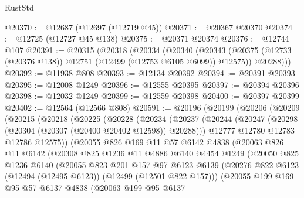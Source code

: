 \begin{lexlean}{RustStd}
\begin{coremodule}
@20370 := @12687 (@12697 (@12719 @45))
@20371 := @20367 @20370
@20374 := @12725 (@12727 @45 @138)
@20375 := @20371 @20374
@20376 := @12744 @107
@20391 := @20315
    (@20318
      (@20334
        (@20340
          (@20343 (@20375 (@12733 (@20376 @138)) @12751 (@12499 (@12753 @6105 @6099)) @12575))
          @20288)))
@20392 := @11938 @808
@20393 := @12134 @20392
@20394 := @20391 @20393
@20395 := @12008 @1249
@20396 := @12555 @20395
@20397 := @20394 @20396
@20398 := @12032 @1249
@20399 := @12559 @20398
@20400 := @20397 @20399
@20402 := @12564 (@12566 @808)
@20591 := @20196
    (@20199
      (@20206
        (@20209
          (@20215
            (@20218
              (@20225
                (@20228
                  (@20234
                    (@20237
                      (@20244
                        (@20247 (@20298 (@20304 (@20307 (@20400 @20402 @12598)) @20288)))
                        @12777
                        @12780
                        @12783
                        @12786
                        @12575))
                    (@20055
                      @826
                      @169
                      @11
                      @57
                      @6142
                      @4838
                      (@20063
                        @826
                        @11
                        @6142
                        (@20308
                          @825
                          @1236
                          @11
                          @4886
                          @6140
                          @4454
                          @1249
                          (@20050
                            @825
                            @1236
                            @6140
                            (@20055
                              @823
                              @201
                              @157
                              @97
                              @6123
                              @6139
                              (@20276
                                @822
                                @6123
                                (@12494 (@12495 @6123))
                                (@12499 (@12501 @822 @157)))
                              (@20055
                                @199
                                @169
                                @95
                                @57
                                @6137
                                @4838
                                (@20063
                                  @199
                                  @95
                                  @6137

\end{coremodule}
\end{lexlean}
